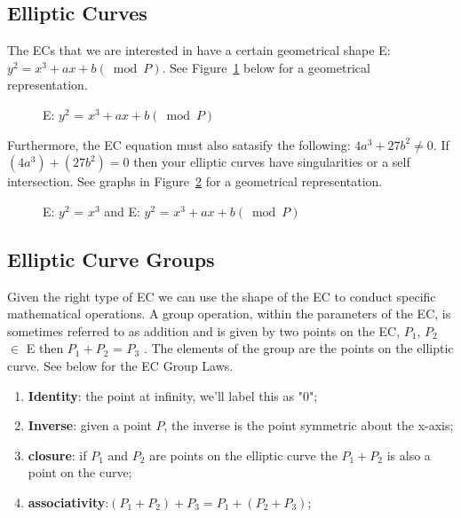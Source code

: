 \subsection{Elliptic Curves}
The  ECs that we are interested in have a certain geometrical shape E: $y^2 = x^3 + ax + b (\bmod P)$.  See Figure~\ref{fig:DH:DHKE_5} below for a geometrical representation.  
\begin{figure}[H]
	  \caption{\label{fig:DH:DHKE_5}   E: $ y^2$ = $x^3+ax+b (\bmod P)$ }
\end{figure}
Furthermore, the EC equation must also satasify the following: $4a^3 + 27b^2 \neq 0$. If $(4a^3)+(27b^2) = 0$ then your elliptic curves have singularities or a self intersection.  See graphs in Figure~\ref{fig:DH:DHKE_10} for a geometrical representation.
\begin{figure}[H]
	  \caption{\label{fig:DH:DHKE_10} E: $ y^2$ = $x^3$ and E: $ y^2$ = $x^3+ax+b (\bmod P)$ }
\end{figure}

\subsection{Elliptic Curve Groups}
Given the right type of EC we can use the shape of the EC to conduct specific mathematical operations. A group operation, within the parameters of the EC, is sometimes referred to as addition and is given by two points on the EC, $P_1$, $P_2$ $\in$ E then $P_1 + P_2$ = $P_3$ .  The elements of the group are the points on the elliptic curve.  See below for the EC Group Laws.

\begin{enumerate}[1.]
\item \textbf{Identity}: the point at infinity, we'll label this as "0"; 
\item \textbf{Inverse}: given a point $P$, the inverse is the point symmetric about the x-axis;
\item \textbf{closure}: if $P_1$ and $P_2$ are points on the elliptic curve the $P_1 + P_2$ is also a point on the curve;
\item \textbf{associativity}:$(P_1 + P_2) + P_3 = P_1 + (P_2 + P_3)$;
\end{enumerate}


